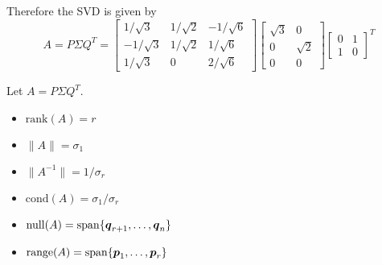 \begin{example}
$$$$
Therefore the SVD is given by
$$
A = P \Sigma Q^T
=
\left[ \begin{array}{rcr} 1/\sqrt{3} & 1/\sqrt{2} & -1/\sqrt{6} \\ -1/\sqrt{3} & 1/\sqrt{2} & 1/\sqrt{6} \\ 1/\sqrt{3} & 0 & 2/\sqrt{6} \end{array} \right]
\left[ \begin{array}{rr} \sqrt{3} & 0 \\ 0 & \sqrt{2} \\ 0 & 0 \end{array} \right]  \begin{bmatrix} 0 & 1 \\ 1 & 0 \end{bmatrix}^T
$$
\end{example}

\begin{proposition}
Let $A = P \Sigma Q^T$.
\begin{itemize}
\item $\mathrm{rank}(A) = r$
\item $\| A \| = \sigma_1$
\item $\| A^{-1} \| = 1/\sigma_r$
\item $\mathrm{cond}(A) = \sigma_1 / \sigma_r$
\item $\mathrm{null}(A) = \mathrm{span} \{ \boldsymbol{q}_{r+1},\dots,\boldsymbol{q}_n \}$
\item $\mathrm{range}(A) = \mathrm{span} \{ \boldsymbol{p}_1,\dots,\boldsymbol{p}_r \}$
\end{itemize}
\end{proposition}
